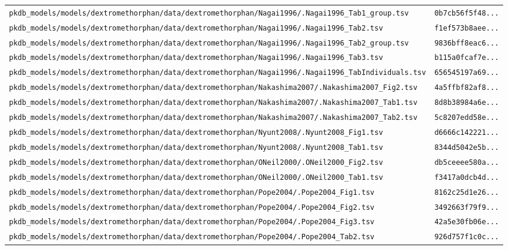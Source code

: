 \begin{longtable}{ll}
\texttt{pkdb\_models/models/dextromethorphan/data/dextromethorphan/Nagai1996/.Nagai1996\_Tab1\_group.tsv} & \texttt{0b7cb56f5f48...} \\
\texttt{pkdb\_models/models/dextromethorphan/data/dextromethorphan/Nagai1996/.Nagai1996\_Tab2.tsv} & \texttt{f1ef573b8aee...} \\
\texttt{pkdb\_models/models/dextromethorphan/data/dextromethorphan/Nagai1996/.Nagai1996\_Tab2\_group.tsv} & \texttt{9836bff8eac6...} \\
\texttt{pkdb\_models/models/dextromethorphan/data/dextromethorphan/Nagai1996/.Nagai1996\_Tab3.tsv} & \texttt{b115a0fcaf7e...} \\
\texttt{pkdb\_models/models/dextromethorphan/data/dextromethorphan/Nagai1996/.Nagai1996\_TabIndividuals.tsv} & \texttt{656545197a69...} \\
\texttt{pkdb\_models/models/dextromethorphan/data/dextromethorphan/Nakashima2007/.Nakashima2007\_Fig2.tsv} & \texttt{4a5ffbf82af8...} \\
\texttt{pkdb\_models/models/dextromethorphan/data/dextromethorphan/Nakashima2007/.Nakashima2007\_Tab1.tsv} & \texttt{8d8b38984a6e...} \\
\texttt{pkdb\_models/models/dextromethorphan/data/dextromethorphan/Nakashima2007/.Nakashima2007\_Tab2.tsv} & \texttt{5c8207edd58e...} \\
\texttt{pkdb\_models/models/dextromethorphan/data/dextromethorphan/Nyunt2008/.Nyunt2008\_Fig1.tsv} & \texttt{d6666c142221...} \\
\texttt{pkdb\_models/models/dextromethorphan/data/dextromethorphan/Nyunt2008/.Nyunt2008\_Tab1.tsv} & \texttt{8344d5042e5b...} \\
\texttt{pkdb\_models/models/dextromethorphan/data/dextromethorphan/ONeil2000/.ONeil2000\_Fig2.tsv} & \texttt{db5ceeee580a...} \\
\texttt{pkdb\_models/models/dextromethorphan/data/dextromethorphan/ONeil2000/.ONeil2000\_Tab1.tsv} & \texttt{f3417a0dcb4d...} \\
\texttt{pkdb\_models/models/dextromethorphan/data/dextromethorphan/Pope2004/.Pope2004\_Fig1.tsv} & \texttt{8162c25d1e26...} \\
\texttt{pkdb\_models/models/dextromethorphan/data/dextromethorphan/Pope2004/.Pope2004\_Fig2.tsv} & \texttt{3492663f79f9...} \\
\texttt{pkdb\_models/models/dextromethorphan/data/dextromethorphan/Pope2004/.Pope2004\_Fig3.tsv} & \texttt{42a5e30fb06e...} \\
\texttt{pkdb\_models/models/dextromethorphan/data/dextromethorphan/Pope2004/.Pope2004\_Tab2.tsv} & \texttt{926d757f1c0c...} \\

\end{longtable}

